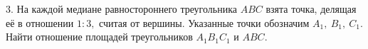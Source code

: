 3. На каждой медиане равностороннего треугольника $ABC$ взята точка, делящая её в отношении $1:3,$ считая от вершины. Указанные точки обозначим $A_1,\ B_1,\ C_1.$ Найти отношение площадей треугольников $A_1B_1C_1$ и $ABC.$\\
